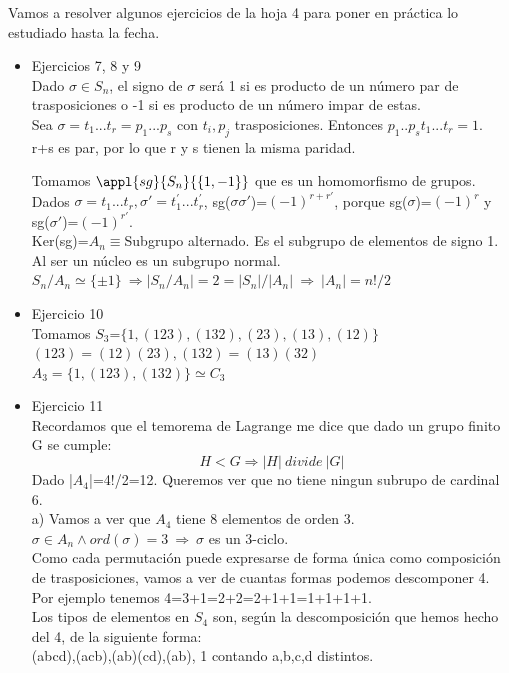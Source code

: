 \documentclass{apuntes}
\begin{document}
Vamos a resolver algunos ejercicios de la hoja 4 para poner en práctica lo estudiado hasta la fecha.
\begin{itemize}
 \item Ejercicios 7, 8 y 9\\
 Dado $\sigma \in S_n$, el signo de $\sigma$  será 1 si es producto de un número par de trasposiciones o -1 si es producto de un número
 impar de estas.\\
 Sea $\sigma = t_1...t_r=p_1...p_s$  con $t_i, p_j$  trasposiciones. Entonces $p_1..p_s t_1...t_r=1$.\\
 r+s es par, por lo que r y s tienen la misma paridad.
 
 Tomamos $\appl{sg}{S_n}{\{1,-1\}}$  que es un homomorfismo de grupos.\\
 Dados $\sigma=t_1...t_r,  \sigma'=t_1^{'}...t_r^{'}$, sg($\sigma \sigma'$)=$(-1)^{r+r'}$, porque sg($\sigma$)=$(-1)^r$  y sg($\sigma'$)=$(-1)^{r'}$.\\
 Ker(sg)=$A_n \equiv$Subgrupo alternado. Es el subgrupo de elementos de signo 1. Al ser un núcleo es un subgrupo normal.\\
 $S_n/A_n\simeq \{\pm 1\} \ \Rightarrow |S_n/A_n|=2=|S_n|/|A_n| \ \Rightarrow \ |A_n|=n!/2$\\
 
 \item Ejercicio 10\\
 Tomamos $S_3$=$\{1, (123), (132), (23), (13), (12)\}$\\
 $(123)=(12)(23), (132)=(13)(32)$\\
 $A_3=\{1, (123), (132)\} \simeq C_3$
 
 \item Ejercicio 11\\
 Recordamos que el temorema de Lagrange me dice que dado un grupo finito G se cumple:
 \[H<G \Rightarrow |H| \ divide\ |G|\]
 Dado |$A_4$|=4!/2=12. Queremos ver que no tiene ningun subrupo de cardinal 6.\\
 
 a) Vamos a ver que $A_4$  tiene 8 elementos de orden 3.\\
 $\sigma\in A_n \wedge ord(\sigma)=3 \ \Rightarrow \ \sigma$  es un 3-ciclo.\\
 Como cada permutación puede expresarse de forma única como composición de trasposiciones, vamos a ver de cuantas formas podemos 
 descomponer 4. Por ejemplo tenemos 4=3+1=2+2=2+1+1=1+1+1+1.\\
 Los tipos de elementos en $S_4$  son, según la descomposición que hemos hecho del 4, de la siguiente forma:\\
 (abcd),(acb),(ab)(cd),(ab), 1 contando a,b,c,d distintos.\\
 

\end{itemize}
\end{document}
